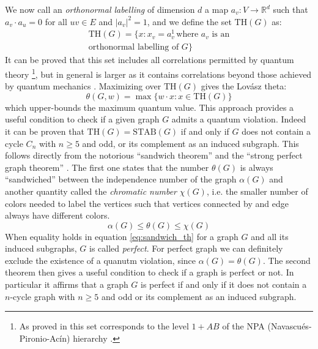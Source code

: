 \documentclass[letterpaper]{article}
\newcommand{\Real}{\mathbb{R}}
\newcommand{\STAB}{\mathrm{STAB}}
\renewcommand{\TH}{\mathrm{TH}}
\begin{document}
We now call an \emph{orthonormal labelling} of dimension $d$ a map
$a_v:V \rightarrow \Real^d$ such that $a_v \cdot a_u = 0$ for all $uv \in E$ and
$|a_v|^2 = 1$, and we define the set $\TH(G)$ as:
\begin{multline}
    \TH(G) = \{x: x_v = a_v^1 \, \text{where $a_v$ is an} \\ \text{orthonormal labelling of $G$}\}
    \label{eq:thbody}
\end{multline}
It can be proved that this set includes all correlations permitted by quantum
theory \footnote{As proved in \cite{acin2015} this set corresponds to the level
$1+AB$ of the NPA (Navascués-Pironio-Acín) hierarchy \cite{npa2008}.}, 
but in general is larger as it contains correlations beyond those achieved by quantum
mechanics \cite{almostquantum2015}.
Maximizing over $\TH(G)$ gives the Lovász theta:
\begin{equation}
    \theta(G,w) = \max \{w\cdot x : x \in \TH(G)\}
    \label{eq:lovasztheta}
\end{equation}
which upper-bounds the maximum quantum value.
This approach provides a useful condition to check if a given graph $G$ admits a
quantum violation. Indeed it can be proven that $\TH(G) = \STAB(G)$ if and only
if $G$ does not contain a cycle $C_n$ with $n \ge 5$ and odd, or its complement
as an induced subgraph. 
This follows directly from the notorious ``sandwich theorem''\cite{knuth, lovasz} and the ``strong
perfect graph theorem'' \cite{spgth}.
The first one states that the number $\theta(G)$ is always ``sandwiched''
between the independence number of the graph $\alpha(G)$ and another quantity
called the \emph{chromatic number} $\chi(G)$, i.e. the smaller number of colors needed
to label the vertices such that vertices connected by and edge always have
different colors.
\begin{equation}
    \alpha(G) \le \theta(G) \le \chi(G)
    \label{eq:sandwich_th}
\end{equation}
When equality holds in equation \eqref{eq:sandwich_th} for a graph $G$ and all its
induced subgraphs, $G$ is called \emph{perfect}.
For perfect graph we can definitely exclude the existence of a quanutm
violation, since $\alpha(G) = \theta(G)$.
The second theorem then gives a useful condition to check if a graph is perfect
or not.  In particular it affirms that a graph $G$ is perfect if and only if it
does not contain a $n$-cycle graph with $n\ge5$ and odd or its complement as an
induced subgraph.
\end{document}
